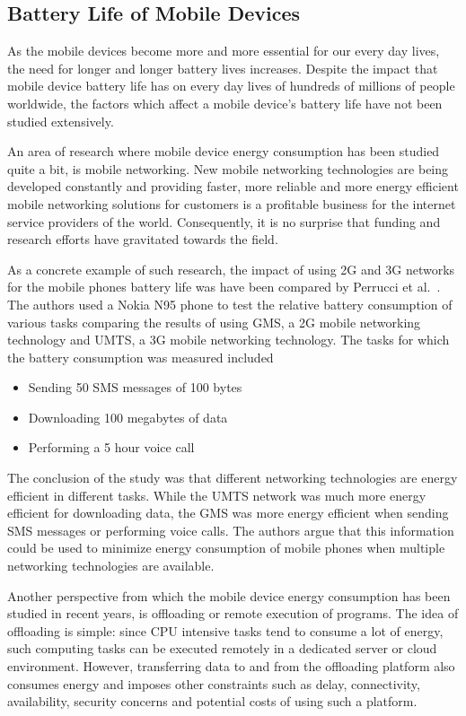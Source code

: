 \subsection{Battery Life of Mobile Devices}

As the mobile devices become more and more essential for our every day lives, the need for longer and longer battery lives increases. Despite the impact that mobile device battery life has on every day lives of hundreds of millions of people worldwide, the factors which affect a mobile device's battery life have not been studied extensively.

An area of research where mobile device energy consumption has been studied quite a bit, is mobile networking. New mobile networking technologies are being developed constantly and providing faster, more reliable and more energy efficient mobile networking solutions for customers is a profitable business for the internet service providers of the world. Consequently, it is no surprise that funding and research efforts have gravitated towards the field.  

As a concrete example of such research, the impact of using 2G and 3G networks for the mobile phones battery life was have been compared by Perrucci et al.~\cite{5357972}. The authors used a Nokia N95 phone to test the relative battery consumption of various tasks comparing the results of using GMS, a 2G mobile networking technology and UMTS, a 3G mobile networking technology. The tasks for which the battery consumption was measured included 

\begin{itemize}
\item Sending 50 SMS messages of 100 bytes
\item Downloading 100 megabytes of data
\item Performing a 5 hour voice call 
\end{itemize} 

The conclusion of the study was that different networking technologies are energy efficient in different tasks. While the UMTS network was much more energy efficient for downloading data, the GMS was more energy efficient when sending SMS messages or performing voice calls. The authors argue that this information could be used to minimize energy consumption of mobile phones when multiple networking technologies are available.       

Another perspective from which the mobile device energy consumption has been studied in recent years, is offloading or remote execution of programs. The idea of offloading is simple: since CPU intensive tasks tend to consume a lot of energy, such computing tasks can be executed remotely in a dedicated server or cloud environment. However, transferring data to and from the offloading platform also consumes energy and imposes other constraints such as delay, connectivity, availability, security concerns and potential costs of using such a platform.

